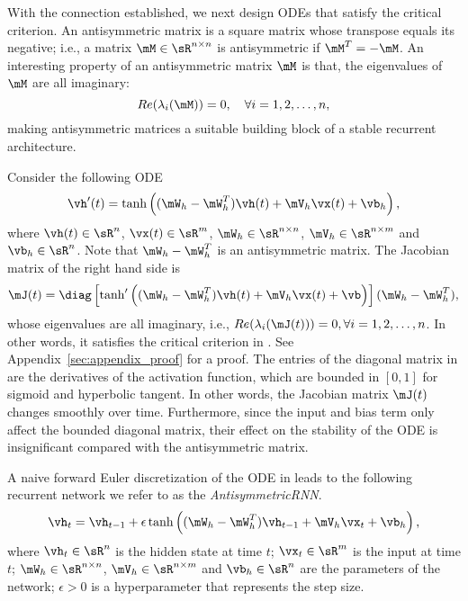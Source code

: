 With the connection established, we next design ODEs that satisfy the critical criterion. An antisymmetric matrix is a square matrix whose transpose equals its negative;
i.e., a matrix $\mM \in \sR^{n \times n}$ is antisymmetric if $\mM^T = -\mM$.
An interesting property of an antisymmetric matrix $\mM$ is that, the eigenvalues of $\mM$ are all imaginary: 
\[
Re(\lambda_i(\mM)) = 0, \quad \forall i=1,2,\ldots,n,
\]
making antisymmetric matrices a suitable building block of a stable recurrent architecture.


Consider the following ODE
\begin{equation}
    \label{eq:antisymm_ODE}
    \vh'(t)
    =
    \tanh\left((\mW_h - \mW_h^T) \vh(t) 
    + \mV_h \vx(t) 
    + \vb_h \right),
\end{equation}
where
$\vh(t) \in \sR^{n}$,
$\vx(t) \in \sR^{m}$,
$\mW_h \in \sR^{n \times n}$, $\mV_h \in \sR^{n \times m}$ and $\vb_h \in \sR^{n}$.
Note that $\mW_h - \mW_h^T$ is an antisymmetric matrix.
The Jacobian matrix of the right hand side is
\begin{equation}
\label{eq:jacobian_antisymm}
\mJ(t) = \diag\left[\tanh'\left((\mW_h - \mW_h^T) \vh(t) 
+ \mV_h \vx(t) 
+ \vb\right)\right] (\mW_h - \mW_h^T),
\end{equation}
whose eigenvalues are all imaginary, i.e., 
$Re(\lambda_i(\mJ(t))) = 0, \forall i=1, 2, \ldots, n$.
In other words, it satisfies the critical criterion in .
See Appendix~\ref{sec:appendix_proof} for a proof.
The entries of the diagonal matrix in  are the derivatives of the activation function, which are bounded in $[0, 1]$ for sigmoid and hyperbolic tangent. 
In other words, the Jacobian matrix $\mJ(t)$ changes smoothly over time.
Furthermore, since the input and bias term only affect the bounded diagonal matrix, their effect on the stability of the ODE is insignificant compared with the antisymmetric matrix.


A naive forward Euler discretization of the ODE in  leads to the following recurrent network
we refer to as the \textit{AntisymmetricRNN}.
\begin{equation}
\label{eq:antisymm_RNN}
\vh_{t}
=
\vh_{t-1}
+
\epsilon
\tanh\left(
(\mW_h - \mW_h^T) \vh_{t-1} + \mV_h \vx_{t} + \vb_h
\right),
\end{equation}
where
$\vh_{t} \in \sR^n$ is the hidden state at time $t$;
$\vx_{t} \in \sR^m$ is the input at time $t$; 
$\mW_h \in \sR^{n \times n}$, $\mV_h \in \sR^{n \times m}$ and $\vb_h \in \sR^{n}$ are the parameters of the network;
$\epsilon > 0$ is a hyperparameter that represents the step size.




